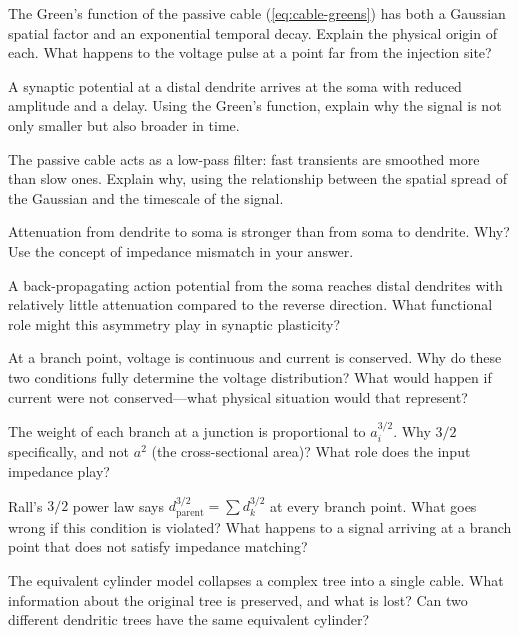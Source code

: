 \begin{conceptquestions}
  \item The Green's function of the passive cable (\cref{eq:cable-greens}) has both a Gaussian spatial factor and an exponential temporal decay. Explain the physical origin of each. What happens to the voltage pulse at a point far from the injection site?

  \item A synaptic potential at a distal dendrite arrives at the soma with reduced amplitude and a delay. Using the Green's function, explain why the signal is not only smaller but also broader in time.

  \item The passive cable acts as a low-pass filter: fast transients are smoothed more than slow ones. Explain why, using the relationship between the spatial spread of the Gaussian and the timescale of the signal.

  \item Attenuation from dendrite to soma is stronger than from soma to dendrite. Why? Use the concept of impedance mismatch in your answer.

  \item A back-propagating action potential from the soma reaches distal dendrites with relatively little attenuation compared to the reverse direction. What functional role might this asymmetry play in synaptic plasticity?

  \item At a branch point, voltage is continuous and current is conserved. Why do these two conditions fully determine the voltage distribution? What would happen if current were not conserved---what physical situation would that represent?

  \item The weight of each branch at a junction is proportional to $a_i^{3/2}$. Why $3/2$ specifically, and not $a^2$ (the cross-sectional area)? What role does the input impedance play?

  \item Rall's $3/2$ power law says $d_{\text{parent}}^{3/2} = \sum d_k^{3/2}$ at every branch point. What goes wrong if this condition is violated? What happens to a signal arriving at a branch point that does not satisfy impedance matching?

  \item The equivalent cylinder model collapses a complex tree into a single cable. What information about the original tree is preserved, and what is lost? Can two different dendritic trees have the same equivalent cylinder?


\end{conceptquestions}

